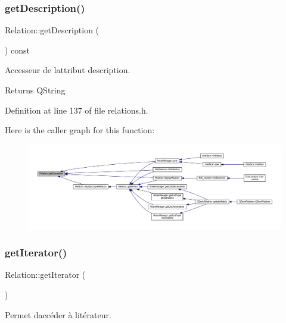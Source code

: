 \subsubsection{\texorpdfstring{get\+Description()}{getDescription()}}
{\footnotesize\ttfamily Relation\+::get\+Description (\begin{DoxyParamCaption}{ }\end{DoxyParamCaption}) const\hspace{0.3cm}{\ttfamily [inline]}}



Accesseur de l\textquotesingle{}attribut description. 

\begin{DoxyReturn}{Returns}
Q\+String 
\end{DoxyReturn}


Definition at line 137 of file relations.\+h.

Here is the caller graph for this function\+:\nopagebreak
\begin{figure}[H]
\begin{center}
\leavevmode
\includegraphics[width=350pt]{class_relation_a925c2f709d5909121d60c2ab203eb201_icgraph}
\end{center}
\end{figure}
\mbox{\label{class_relation_aedcb559cf6471c8eb731026e45fd00a0}} 
\subsubsection{\texorpdfstring{get\+Iterator()}{getIterator()}}
{\footnotesize\ttfamily Relation\+::get\+Iterator (\begin{DoxyParamCaption}{ }\end{DoxyParamCaption})\hspace{0.3cm}{\ttfamily [inline]}}



Permet d\textquotesingle{}accéder à l\textquotesingle{}itérateur. 

